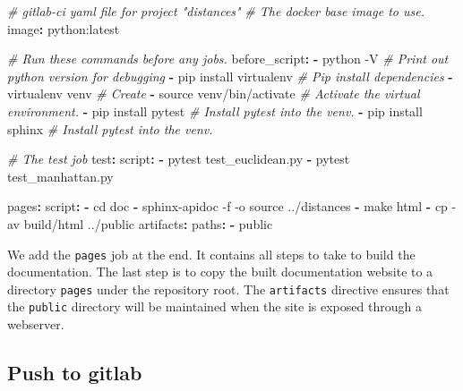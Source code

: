 \documentclass[11pt]{article}
\newenvironment{Shaded}{}{}
\newcommand{\KeywordTok}[1]{\textcolor[rgb]{0.00,0.44,0.13}{\textbf{{#1}}}}
\newcommand{\CommentTok}[1]{\textcolor[rgb]{0.38,0.63,0.69}{\textit{{#1}}}}
\newcommand{\FunctionTok}[1]{\textcolor[rgb]{0.02,0.16,0.49}{{#1}}}
\newcommand{\AttributeTok}[1]{\textcolor[rgb]{0.49,0.56,0.16}{{#1}}}
\begin{document}
\begin{Shaded}
\begin{Highlighting}[]
\CommentTok{\# gitlab{-}ci yaml file for project "distances"}
\CommentTok{\# The docker base image to use.}
\FunctionTok{image}\KeywordTok{:}\AttributeTok{ python:latest}

\CommentTok{\# Run these commands before any jobs.}
\FunctionTok{before\_script}\KeywordTok{:}
\AttributeTok{  }\KeywordTok{{-}}\AttributeTok{ python {-}V}\CommentTok{                 \# Print out python version for debugging}
\AttributeTok{  }\KeywordTok{{-}}\AttributeTok{ pip install virtualenv}\CommentTok{    \# Pip install dependencies}
\AttributeTok{  }\KeywordTok{{-}}\AttributeTok{ virtualenv venv}\CommentTok{           \# Create }
\AttributeTok{  }\KeywordTok{{-}}\AttributeTok{ source venv/bin/activate}\CommentTok{  \# Activate the virtual environment.}
\AttributeTok{  }\KeywordTok{{-}}\AttributeTok{ pip install pytest}\CommentTok{        \# Install pytest into the venv.}
\AttributeTok{  }\KeywordTok{{-}}\AttributeTok{ pip install sphinx}\CommentTok{        \# Install pytest into the venv.}

\CommentTok{\# The test job }
\FunctionTok{test}\KeywordTok{:}
\AttributeTok{  }\FunctionTok{script}\KeywordTok{:}
\AttributeTok{    }\KeywordTok{{-}}\AttributeTok{ pytest test\_euclidean.py}
\AttributeTok{    }\KeywordTok{{-}}\AttributeTok{ pytest test\_manhattan.py}

\FunctionTok{pages}\KeywordTok{:}
\AttributeTok{  }\FunctionTok{script}\KeywordTok{:}
\AttributeTok{    }\KeywordTok{{-}}\AttributeTok{ cd doc}
\AttributeTok{    }\KeywordTok{{-}}\AttributeTok{ sphinx{-}apidoc {-}f {-}o source ../distances}
\AttributeTok{    }\KeywordTok{{-}}\AttributeTok{ make html}
\AttributeTok{    }\KeywordTok{{-}}\AttributeTok{ cp {-}av build/html ../public}
\AttributeTok{  }\FunctionTok{artifacts}\KeywordTok{:}
\AttributeTok{    }\FunctionTok{paths}\KeywordTok{:}
\AttributeTok{      }\KeywordTok{{-}}\AttributeTok{ public}
\end{Highlighting}
\end{Shaded}

We add the \texttt{pages} job at the end. It contains all steps to take
to build the documentation. The last step is to copy the built
documentation website to a directory \texttt{pages} under the repository
root. The \texttt{artifacts} directive ensures that the \texttt{public}
directory will be maintained when the site is exposed through a
webserver.

\hypertarget{push-to-gitlab}{%
\subsection{Push to gitlab}\label{push-to-gitlab}}
\end{document}
